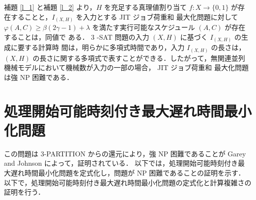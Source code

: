 \documentclass[12pt]{optlab-bachelor}
\begin{document}
補題 \ref{l_1} と補題 \ref{l_2} より，$H$ を充足する真理値割り当て $f : X \to \{0,
1\}$ が存在することと，$I_{(X,H)}$ を入力とする JIT ジョブ荷重和
最大化問題に対して $\varphi(A, C) \ge \beta(2\gamma − 1) + \lambda$
を満たす実行可能なスケジュール $(A, C)$ が存在することは，同値で
ある．
3 -SAT 問題の入力 $(X,H)$ に基づく $I_{(X,H)}$ の生成に要する計算時
間は，明らかに多項式時間であり，入力 $I_{(X,H)}$ の長さは，$(X, H)$
の長さに関する多項式で表すことができる．したがって，無関連並列
機械モデルにおいて機械数が入力の一部の場合， JIT ジョブ荷重和
最大化問題は強 NP 困難である．

\section{処理開始可能時刻付き最大遅れ時間最小化問題}\label{3_s_2}

この問題は \textsc{3-PARTITION} からの還元により，強 NP 困難であることが Garey and Johnson \cite{3SAT}によって，証明されている．
以下では，処理開始可能時刻付き最大遅れ時間最小化問題を定式化し，問題が NP 困難であることの証明を示す．
以下で，処理開始可能時刻付き最大遅れ時間最小化問題の定式化と計算複雑さの証明を行う．
\end{document}
